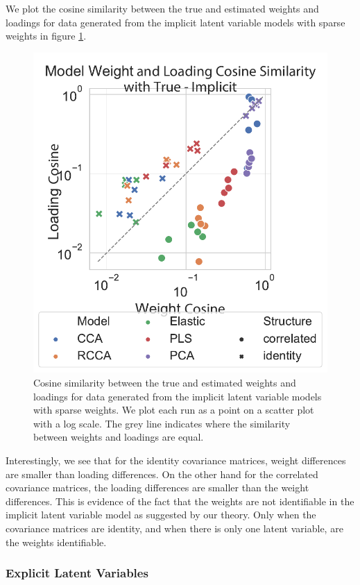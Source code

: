 We plot the cosine similarity between the true and estimated weights and \gls{loadings} for data generated from the implicit latent variable models with sparse weights in figure \ref{fig:implicit-weights-loadings-cosine}.

\begin{figure}
\centering
\includegraphics[width=0.8\linewidth]{figures/simulated/implicit/weight_loading_difference}
\caption{Cosine similarity between the true and estimated weights and \gls{loadings} for data generated from the implicit latent variable models with sparse weights. We plot each run as a point on a scatter plot with a log scale. The grey line indicates where the similarity between weights and loadings are equal.}\label{fig:implicit-weights-loadings-cosine}
\end{figure}

Interestingly, we see that for the identity covariance matrices, weight differences are smaller than loading differences.
On the other hand for the correlated covariance matrices, the loading differences are smaller than the weight differences.
This is evidence of the fact that the weights are not identifiable in the implicit latent variable model as suggested by our theory.
Only when the covariance matrices are identity, and when there is only one latent variable, are the weights identifiable.

\subsubsection{Explicit Latent Variables}

